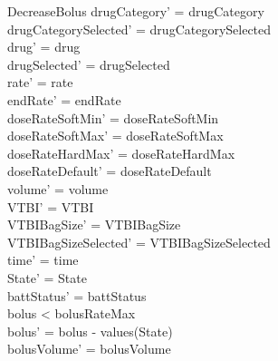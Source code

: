 \begin{schema}{DecreaseBolus}
	drugCategory' = drugCategory\\ 
	\pagebreak
	drugCategorySelected' = drugCategorySelected\\
	drug' = drug\\ drugSelected' = drugSelected\\
	rate' = rate\\
	endRate' = endRate\\
	doseRateSoftMin' = doseRateSoftMin\\
	doseRateSoftMax' = doseRateSoftMax\\
	doseRateHardMax' = doseRateHardMax\\
	doseRateDefault' = doseRateDefault\\
	volume' = volume\\
	VTBI' = VTBI\\
	VTBIBagSize' = VTBIBagSize\\ VTBIBagSizeSelected' = VTBIBagSizeSelected\\
	time' = time\\ State' = State\\
	battStatus' = battStatus\\
	bolus < bolusRateMax\\
	bolus' = bolus - values(State)\\
	bolusVolume' = bolusVolume\\

\end{schema}
